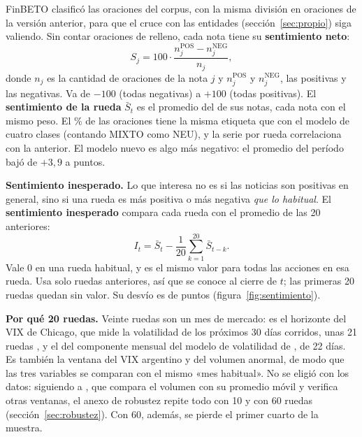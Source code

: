 FinBETO clasificó las  oraciones del corpus, con la misma
división en oraciones de la versión anterior, para que el cruce con las entidades
(sección~\ref{sec:propio}) siga valiendo. Sin contar 
oraciones de relleno, cada nota tiene su \textbf{sentimiento neto}:
\begin{equation}
S_j = 100\cdot\frac{n^{\text{POS}}_j - n^{\text{NEG}}_j}{n_j},
\end{equation}
donde $n_j$ es la cantidad de oraciones de la nota $j$ y $n^{\text{POS}}_j$ y $n^{\text{NEG}}_j$,
las positivas y las negativas. Va de $-100$ (todas negativas) a $+100$ (todas positivas). El
\textbf{sentimiento de la rueda} $\bar S_t$ es el promedio del de sus notas, cada nota con el mismo
peso. El \% de las oraciones tiene la misma etiqueta que con el modelo
de cuatro clases (contando MIXTO como NEU), y la serie por rueda correlaciona
 con la anterior. El modelo nuevo es algo más negativo:
el promedio del período bajó de $+3{,}9$ a  puntos.

\textbf{Sentimiento inesperado.}
\label{sec:inesperado}
Lo que interesa no es si las noticias son positivas en general, sino si una rueda es más positiva
o más negativa \textit{que lo habitual}. El \textbf{sentimiento inesperado} compara cada rueda con
el promedio de las 20 anteriores:
\begin{equation}
I_t = \bar S_t - \frac{1}{20}\sum_{k=1}^{20} \bar S_{t-k}.
\end{equation}
Vale 0 en una rueda habitual, y es el mismo valor para todas las acciones en esa rueda. Usa solo
ruedas anteriores, así que se conoce al cierre de $t$; las primeras 20 ruedas quedan sin valor. Su
desvío es de  puntos (figura~\ref{fig:sentimiento}).

\textbf{Por qué 20 ruedas.} Veinte ruedas son un mes de mercado: es el horizonte del VIX de
Chicago, que mide la volatilidad de los próximos 30 días corridos, unas 21 ruedas
\citep{cboe_vix}, y el del componente mensual del modelo de volatilidad de \citet{corsi2009}, de
22 días. Es también la ventana del VIX argentino y del volumen anormal, de modo que las tres
variables se comparan con el mismo «mes habitual». No se eligió con los datos: siguiendo a
\citet{tetlock2007}, que compara el volumen con su promedio móvil y verifica otras ventanas, el
anexo de robustez repite todo con 10 y con 60 ruedas (sección~\ref{sec:robustez}). Con 60, además,
se pierde el primer cuarto de la muestra.

